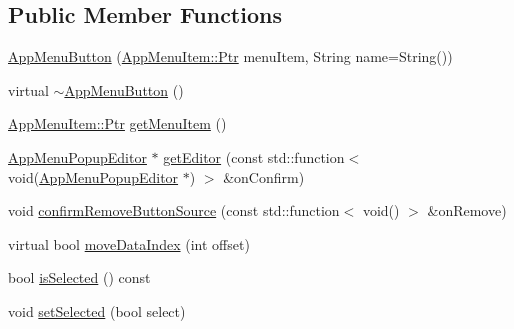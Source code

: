 \subsection*{Public Member Functions}
\begin{DoxyCompactItemize}
\item 
\mbox{\hyperlink{classAppMenuButton_ac107b991d1f46e6bc21005ca1d46b350}{App\+Menu\+Button}} (\mbox{\hyperlink{classAppMenuItem_ab5f51c5d74f8df62b8862c0cc8126cb7}{App\+Menu\+Item\+::\+Ptr}} menu\+Item, String name=String())
\item 
virtual \mbox{\hyperlink{classAppMenuButton_aaf609655fb3b0f5d7a14ba82b7339929}{$\sim$\+App\+Menu\+Button}} ()
\item 
\mbox{\hyperlink{classAppMenuItem_ab5f51c5d74f8df62b8862c0cc8126cb7}{App\+Menu\+Item\+::\+Ptr}} \mbox{\hyperlink{classAppMenuButton_aa4d1780267f97aba5f0cc8359cbea3b2}{get\+Menu\+Item}} ()
\item 
\mbox{\hyperlink{classAppMenuPopupEditor}{App\+Menu\+Popup\+Editor}} $\ast$ \mbox{\hyperlink{classAppMenuButton_a388243c4b6afa532afce4352e35bfec4}{get\+Editor}} (const std\+::function$<$ void(\mbox{\hyperlink{classAppMenuPopupEditor}{App\+Menu\+Popup\+Editor}} $\ast$) $>$ \&on\+Confirm)
\item 
void \mbox{\hyperlink{classAppMenuButton_ad89d44c5aacdb80c10af0259e6502b27}{confirm\+Remove\+Button\+Source}} (const std\+::function$<$ void() $>$ \&on\+Remove)
\item 
virtual bool \mbox{\hyperlink{classAppMenuButton_a9e7e01517bf52a0e1519206e6c76db7a}{move\+Data\+Index}} (int offset)
\item 
bool \mbox{\hyperlink{classAppMenuButton_aae298a5007ccac5f71c89375d1954d74}{is\+Selected}} () const
\item 
void \mbox{\hyperlink{classAppMenuButton_a9cc29333d34ad085a110abd03d7ee6d9}{set\+Selected}} (bool select)
\end{DoxyCompactItemize}
